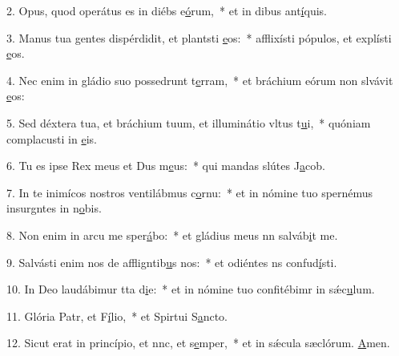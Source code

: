 2. Opus, quod operátus es in diébs e\uline{ó}rum,~* et in dibus ant\uline{í}quis.\par 
3. Manus tua gentes dispérdidit, et plantsti \uline{e}os:~* afflixísti pópulos, et explísti \uline{e}os.\par 
4. Nec enim in gládio suo possedrunt t\uline{e}rram,~* et bráchium eórum non slvávit \uline{e}os:\par 
5. Sed déxtera tua, et bráchium tuum, et illuminátio vltus t\uline{u}i,~* quóniam complacusti in \uline{e}is.\par 
6. Tu es ipse Rex meus et Dus m\uline{e}us:~* qui mandas slútes J\uline{a}cob.\par 
7. In te inimícos nostros ventilábmus c\uline{o}rnu:~* et in nómine tuo spernémus insurgntes in n\uline{o}bis.\par 
8. Non enim in arcu me sper\uline{á}bo:~* et gládius meus nn salváb\uline{i}t me.\par 
9. Salvásti enim nos de affligntib\uline{u}s nos:~* et odiéntes ns confud\uline{í}sti.\par 
10. In Deo laudábimur tta d\uline{i}e:~* et in nómine tuo confitébimr in sǽc\uline{u}lum.\par 
11. Glória Patr, et F\uline{í}lio,~* et Spirtui S\uline{a}ncto.\par 
12. Sicut erat in princípio, et nnc, et s\uline{e}mper,~* et in sǽcula sæclórum. \uline{A}men.\par 
